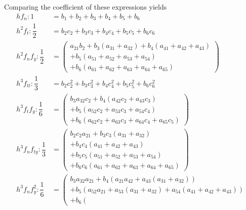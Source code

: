 \documentclass[a4paper,oneside]{book}
\numberwithin{equation}{chapter}
\begin{document}
Comparing the coefficient of these expressions yields
\begin{align}
h{f_n}:1 &= {b_1} + {b_2} + {b_3} + {b_4} + {b_5} + {b_6}\\
{h^2}{f_t}:\dfrac{1}{2} &= {b_2}{c_2} + {b_3}{c_3} + {b_4}{c_4} + {b_5}{c_5} + {b_6}{c_6}\\
{h^2}{f_n}{f_y}:\dfrac{1}{2} &= \left( \begin{array}{l}
{a_{21}}{b_2} + {b_3}\left( {{a_{31}} + {a_{32}}} \right) + {b_4}\left( {{a_{41}} + {a_{42}} + {a_{43}}} \right)\\
 + {b_5}\left( {{a_{51}} + {a_{52}} + {a_{53}} + {a_{54}}} \right)\\
 + {b_6}\left( {{a_{61}} + {a_{62}} + {a_{63}} + {a_{64}} + {a_{65}}} \right)
\end{array} \right)\\
{h^3}{f_{tt}}:\dfrac{1}{3} &= {b_2}c_2^2 + {b_3}c_3^2 + {b_4}c_4^2 + {b_5}c_5^2 + {b_6}c_6^2\\
{h^3}{f_t}{f_y}:\dfrac{1}{6} &= \left( \begin{array}{l}
{b_3}{a_{32}}{c_2} + {b_4}\left( {{a_{42}}{c_2} + {a_{43}}{c_3}} \right)\\
 + {b_5}\left( {{a_{52}}{c_2} + {a_{53}}{c_3} + {a_{54}}{c_4}} \right)\\
 + {b_6}\left( {{a_{62}}{c_2} + {a_{63}}{c_3} + {a_{64}}{c_4} + {a_{65}}{c_5}} \right)
\end{array} \right)\\
{h^3}{f_n}{f_{ty}}:\dfrac{1}{3} &= \left( \begin{array}{l}
{b_2}{c_2}{a_{21}} + {b_3}{c_3}\left( {{a_{31}} + {a_{32}}} \right)\\
 + {b_4}{c_4}\left( {{a_{41}} + {a_{42}} + {a_{43}}} \right)\\
 + {b_5}{c_5}\left( {{a_{51}} + {a_{52}} + {a_{53}} + {a_{54}}} \right)\\
 + {b_6}{c_6}\left( {{a_{61}} + {a_{62}} + {a_{63}} + {a_{64}} + {a_{65}}} \right)
\end{array} \right)\\
{h^3}{f_n}f_y^2:\dfrac{1}{6} &= \left( \begin{array}{l}
{b_3}{a_{32}}{a_{21}} + {b_4}\left( {{a_{21}}{a_{42}} + {a_{43}}\left( {{a_{31}} + {a_{32}}} \right)} \right)\\
 + {b_5}\left( {{a_{52}}{a_{21}} + {a_{53}}\left( {{a_{31}} + {a_{32}}} \right) + {a_{54}}\left( {{a_{41}} + {a_{42}} + {a_{43}}} \right)} \right)\\
 + {b_6}\left( \begin{array}{l}

\end{array}
\end{array}
\end{align}
\end{document}
